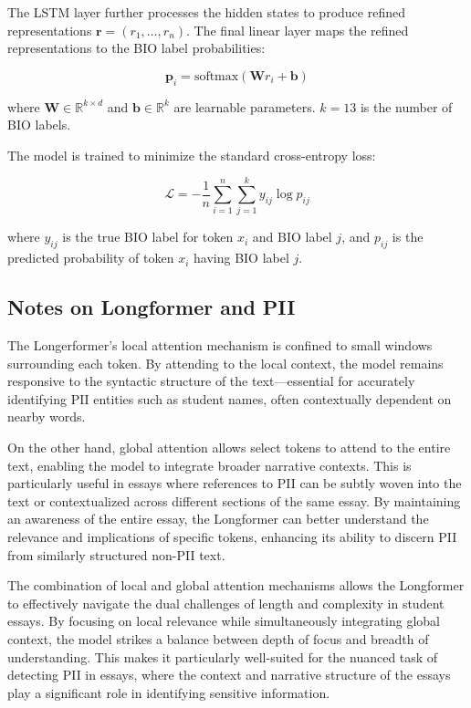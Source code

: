 \documentclass[11pt]{article}
\begin{document}
The LSTM layer further processes the hidden states to produce refined representations $\mathbf{r} = (r_1, \ldots, r_n)$. The final linear layer maps the refined representations to the BIO label probabilities:

\begin{equation*}
\mathbf{p}_i = \text{softmax}(\mathbf{W}r_i + \mathbf{b})
\end{equation*}

where $\mathbf{W} \in \mathbb{R}^{k \times d}$ and $\mathbf{b} \in \mathbb{R}^k$ are learnable parameters. $k=13$ is the number of BIO labels.

The model is trained to minimize the standard cross-entropy loss:

\begin{equation*}
\mathcal{L} = -\frac{1}{n} \sum_{i=1}^n \sum_{j=1}^k y_{ij} \log p_{ij}
\end{equation*}

where $y_{ij}$ is the true BIO label for token $x_i$ and BIO label $j$, and $p_{ij}$ is the predicted probability of token $x_i$ having BIO label $j$.


\subsection{Notes on Longformer and PII}

The Longerformer's local attention mechanism is confined to small windows surrounding each token. By attending to the local context, the model remains responsive to the syntactic structure of the text—essential for accurately identifying PII entities such as student names, often contextually dependent on nearby words.

On the other hand, global attention allows select tokens to attend to the entire text, enabling the model to integrate broader narrative contexts. This is particularly useful in essays where references to PII can be subtly woven into the text or contextualized across different sections of the same essay. By maintaining an awareness of the entire essay, the Longformer can better understand the relevance and implications of specific tokens, enhancing its ability to discern PII from similarly structured non-PII text.

The combination of local and global attention mechanisms allows the Longformer to effectively navigate the dual challenges of length and complexity in student essays. By focusing on local relevance while simultaneously integrating global context, the model strikes a balance between depth of focus and breadth of understanding. This makes it particularly well-suited for the nuanced task of detecting PII in essays, where the context and narrative structure of the essays play a significant role in identifying sensitive information.
\end{document}
